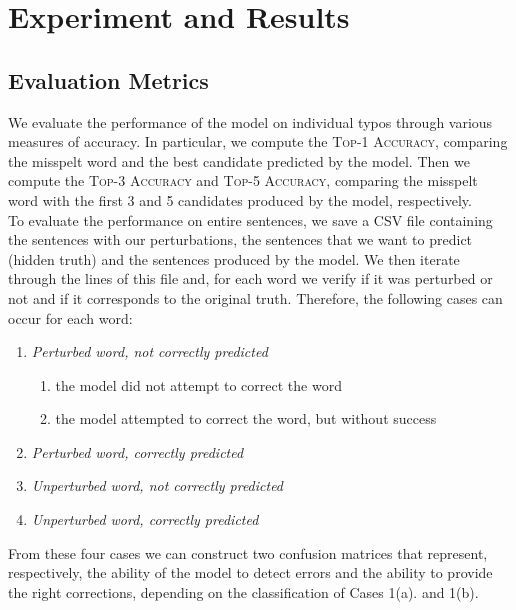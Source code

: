 \chapter{Experiment and Results}

\section{Evaluation Metrics}
We evaluate the performance of the model on individual typos through various measures of accuracy. In particular, we 
compute the \textsc{Top-1 Accuracy}, comparing the misspelt word and the best candidate predicted by the 
model. Then we compute the \textsc{Top-3 Accuracy} and \textsc{Top-5 Accuracy}, comparing the misspelt word 
with the first \num{3} and \num{5} candidates produced by the model, respectively.\\

To evaluate the performance on entire sentences, we save a CSV file containing the sentences with our perturbations, 
the sentences that we want to predict (hidden truth) and the sentences produced by the model. We then iterate through 
the lines of this file and, for each word we verify if it was perturbed or not and if it corresponds to the original 
truth. Therefore, the following cases can occur for each word:
\begin{enumerate}
	\item \textit{Perturbed word, not correctly predicted}
	\begin{enumerate}
		\item the model did not attempt to correct the word
		\item the model attempted to correct the word, but without success
	\end{enumerate}
	\item \textit{Perturbed word, correctly predicted}
	\item \textit{Unperturbed word, not correctly predicted}
	\item \textit{Unperturbed word, correctly predicted}
\end{enumerate}

From these four cases we can construct two confusion matrices that represent, respectively, the ability of the model to 
detect errors and the ability to provide the right corrections, depending on the classification of Cases 1(a). and 1(b).


